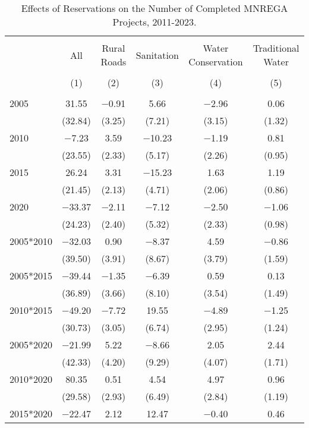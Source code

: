 
\begin{table}[!htbp] \centering 
  \caption{Effects of Reservations on the Number of Completed MNREGA Projects, 2011-2023.} 
  \label{main_mnrega_2011_2023_all} 
\scriptsize 
\begin{tabular}{@{\extracolsep{0pt}}lccccc} 
\\[-1.8ex]\hline 
\hline \\[-1.8ex] 
 & All & Rural Roads & Sanitation & Water Conservation & Traditional Water \\ 
\\[-1.8ex] & (1) & (2) & (3) & (4) & (5)\\ 
\hline \\[-1.8ex] 
 2005 & 31.55 & $-$0.91 & 5.66 & $-$2.96 & 0.06 \\ 
  & (32.84) & (3.25) & (7.21) & (3.15) & (1.32) \\ 
  2010 & $-$7.23 & 3.59 & $-$10.23 & $-$1.19 & 0.81 \\ 
  & (23.55) & (2.33) & (5.17) & (2.26) & (0.95) \\ 
  2015 & 26.24 & 3.31 & $-$15.23 & 1.63 & 1.19 \\ 
  & (21.45) & (2.13) & (4.71) & (2.06) & (0.86) \\ 
  2020 & $-$33.37 & $-$2.11 & $-$7.12 & $-$2.50 & $-$1.06 \\ 
  & (24.23) & (2.40) & (5.32) & (2.33) & (0.98) \\ 
  2005*2010 & $-$32.03 & 0.90 & $-$8.37 & 4.59 & $-$0.86 \\ 
  & (39.50) & (3.91) & (8.67) & (3.79) & (1.59) \\ 
  2005*2015 & $-$39.44 & $-$1.35 & $-$6.39 & 0.59 & 0.13 \\ 
  & (36.89) & (3.66) & (8.10) & (3.54) & (1.49) \\ 
  2010*2015 & $-$49.20 & $-$7.72 & 19.55 & $-$4.89 & $-$1.25 \\ 
  & (30.73) & (3.05) & (6.74) & (2.95) & (1.24) \\ 
  2005*2020 & $-$21.99 & 5.22 & $-$8.66 & 2.05 & 2.44 \\ 
  & (42.33) & (4.20) & (9.29) & (4.07) & (1.71) \\ 
  2010*2020 & 80.35 & 0.51 & 4.54 & 4.97 & 0.96 \\ 
  & (29.58) & (2.93) & (6.49) & (2.84) & (1.19) \\ 
  2015*2020 & $-$22.47 & 2.12 & 12.47 & $-$0.40 & 0.46 \\ 

\end{tabular}
\end{table}
